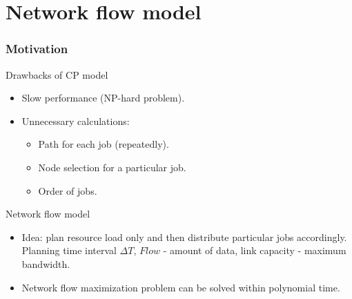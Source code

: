 \documentclass{beamer}
\begin{document}
\section{Network flow model}
\begin{frame}\frametitle{Motivation}
\begin{block}{Drawbacks of CP model}
\begin{itemize}
\item Slow performance (NP-hard problem).
\item Unnecessary calculations:
			\begin{itemize}
			\item Path for each job (repeatedly).
			\item Node selection for a particular job.
			\item Order  of jobs.
			\end{itemize}
\end{itemize}
\end{block}         

\begin{block}{Network flow model}
\begin{itemize}
\item Idea: plan resource load only and then distribute particular jobs accordingly. Planning time interval $\Delta T$, $Flow$ - amount of data, link capacity - maximum bandwidth.
\item Network flow maximization problem can be solved within polynomial time.
\end{itemize}
\end{block}    
\end{frame}
\end{document}
